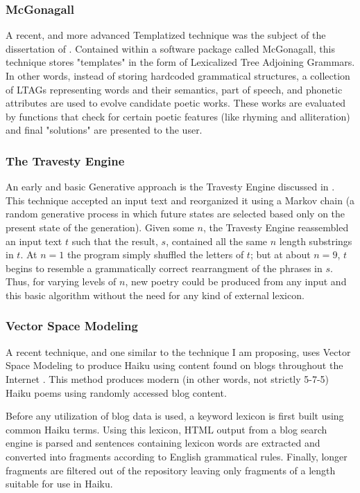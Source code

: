 \documentclass[10pt]{article}
\begin{document}
\subsubsection{McGonagall}
A recent, and more advanced Templatized technique was the subject of the
dissertation of \cite{Manurung03}. Contained within a software package called
McGonagall, this technique stores "templates" in the form of Lexicalized Tree
Adjoining Grammars. In other words, instead of storing hardcoded grammatical
structures, a collection of LTAGs representing words and their semantics, part
of speech, and phonetic attributes are used to evolve candidate poetic works.
These works are evaluated by functions that check for certain poetic features
(like rhyming and alliteration) and final "solutions" are presented to the
user.

\subsubsection{The Travesty Engine}
An early and basic Generative approach is the Travesty Engine discussed in
\cite{Hart96}. This technique accepted an input text and reorganized it using a
Markov chain (a random generative process in which future states are selected
based only on the present state of the generation). Given some $n$, the
Travesty Engine reassembled an input text $t$ such that the result, $s$,
contained all the same $n$ length substrings in $t$. At $n = 1$ the program
simply shuffled the letters of $t$; but at about $n = 9$, $t$ begins to
resemble a grammatically correct rearrangment of the phrases in $s$. Thus, for
varying levels of $n$, new poetry could be produced from any input and this
basic algorithm without the need for any kind of external lexicon.

\subsubsection{Vector Space Modeling}
A recent technique, and one similar to the technique I am proposing, uses
Vector Space Modeling to produce Haiku using content found on blogs throughout
the Internet \cite{Wong08}. This method produces modern (in other words, not
strictly 5-7-5) Haiku poems using randomly accessed blog content. 

Before any utilization of blog data is used, a keyword lexicon is first built
using common Haiku terms. Using this lexicon, HTML output from a blog search
engine is parsed and sentences containing lexicon words are extracted and
converted into fragments according to English grammatical rules. Finally, longer
fragments are filtered out of the repository leaving only fragments of a length
suitable for use in Haiku.
\end{document}
